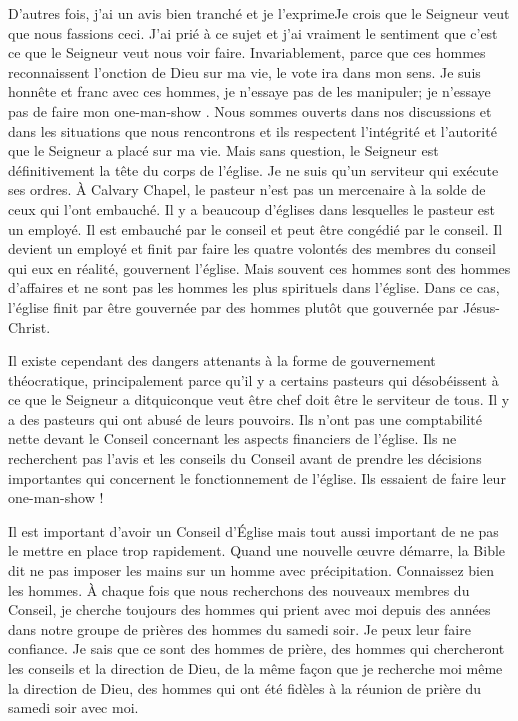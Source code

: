 D’autres fois, j’ai un avis bien tranché et je l’exprime\frcolon\og Je crois que le Seigneur veut que nous fassions ceci. J’ai prié à
ce sujet et j’ai vraiment le sentiment que c’est ce que le Seigneur veut nous voir faire. Invariablement, parce que ces
hommes reconnaissent l’onction de Dieu sur ma vie, le vote ira dans mon sens. Je suis honnête et franc avec ces
hommes, je n’essaye pas de les manipuler; je n’essaye pas de faire mon \og one-man-show \fg{}. Nous sommes ouverts
dans nos discussions et dans les situations que nous rencontrons et ils respectent l’intégrité et l’autorité que le
Seigneur a placé sur ma vie. Mais sans question, le Seigneur est définitivement la tête du corps de l’église. Je ne suis
qu’un serviteur qui exécute ses ordres. À Calvary Chapel, le pasteur n’est pas un mercenaire à la solde de ceux qui
l'ont embauché. Il y a beaucoup d’églises dans lesquelles le pasteur est un employé. Il est embauché par le conseil et
peut être congédié par le conseil. Il devient un employé et finit par faire les quatre volontés des membres du conseil
qui eux en réalité, gouvernent l’église. Mais souvent ces hommes sont des hommes d’affaires et ne sont pas les
hommes les plus spirituels dans l’église. Dans ce cas, l’église finit par être gouvernée par des hommes plutôt que
gouvernée par Jésus-Christ.

Il existe cependant des dangers attenants à la forme de gouvernement théocratique, principalement parce qu’il y a
certains pasteurs qui désobéissent à ce que le Seigneur a dit\frcolon\og quiconque veut être chef doit être le serviteur de
tous.\fg{} Il y a des pasteurs qui ont abusé de leurs pouvoirs. Ils n’ont pas une comptabilité nette devant le Conseil
concernant les aspects financiers de l’église. Ils ne recherchent pas l’avis et les conseils du Conseil avant de prendre
les décisions importantes qui concernent le fonctionnement de l’église. Ils essaient de faire leur \og one-man-show \fg{}!

Il est important d’avoir un Conseil d’Église mais tout aussi important de ne pas le mettre en place trop rapidement.
Quand une nouvelle œuvre démarre, la Bible dit ne pas imposer les mains sur un homme avec précipitation.
Connaissez bien les hommes. À chaque fois que nous recherchons des nouveaux membres du Conseil, je cherche
toujours des hommes qui prient avec moi depuis des années dans notre groupe de prières des hommes du samedi
soir. Je peux leur faire confiance. Je sais que ce sont des hommes de prière, des hommes qui chercheront les conseils
et la direction de Dieu, de la même façon que je recherche moi même la direction de Dieu, des hommes qui ont été
fidèles à la réunion de prière du samedi soir avec moi.

